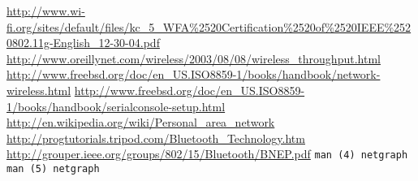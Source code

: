 \begin{thebibliography}{99}
        \url{http://www.wi-fi.org/sites/default/files/kc_5_WFA%2520Certification%2520of%2520IEEE%2520802.11g-English_12-30-04.pdf}
        \url{http://www.oreillynet.com/wireless/2003/08/08/wireless_throughput.html}
        \url{http://www.freebsd.org/doc/en_US.ISO8859-1/books/handbook/network-wireless.html}
        \url{http://www.freebsd.org/doc/en_US.ISO8859-1/books/handbook/serialconsole-setup.html}
        \url{http://en.wikipedia.org/wiki/Personal_area_network}
        \url{http://progtutorials.tripod.com/Bluetooth_Technology.htm}
        \url{http://grouper.ieee.org/groups/802/15/Bluetooth/BNEP.pdf}
        {\texttt{man (4) netgraph}}
        {\texttt{man (5) netgraph}}
\end{thebibliography}
